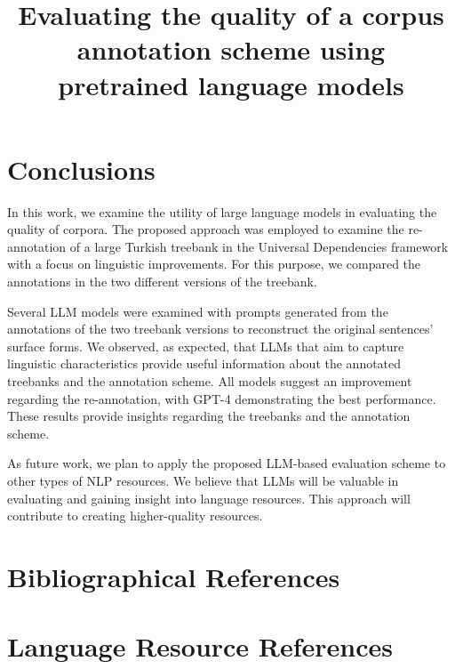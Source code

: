 \documentclass[10pt, a4paper]{article}
\title{Evaluating the quality of a corpus annotation scheme using pretrained language models}
\begin{document}


\maketitleabstract







\section{Conclusions}
\label{sec:conclusions}
In this work, we examine the utility of large language models in evaluating the quality of corpora. The proposed approach was employed to examine the re-annotation  of a large Turkish treebank in the Universal Dependencies framework with a focus on linguistic improvements. For this purpose, we compared the annotations in the two different versions of the treebank.

Several LLM models were examined with prompts generated from the annotations of the two treebank versions to reconstruct the original sentences' surface forms. We observed, as expected, that LLMs that aim to capture linguistic characteristics provide useful information about the annotated treebanks and the annotation scheme. All models suggest an improvement regarding the re-annotation, with GPT-4 demonstrating the best performance. These results provide insights regarding the treebanks and the annotation scheme.

As future work, we plan to apply the proposed LLM-based evaluation scheme to other types of NLP resources. We believe that LLMs will be valuable in evaluating and gaining insight into language resources. This approach will contribute to creating higher-quality resources.

\nocite{*}
\section{Bibliographical References}\label{sec:reference}




\section{Language Resource References}
\label{lr:ref}
\end{document}
